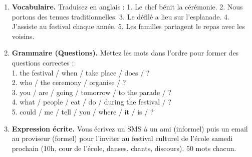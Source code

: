 \documentclass[11pt]{article}
\begin{document}
\begin{exercice}
\begin{enumerate}
\item \textbf{Vocabulaire.} Traduisez en anglais : 1. Le chef bénit la cérémonie. 2. Nous portons des tenues traditionnelles. 3. Le défilé a lieu sur l'esplanade. 4. J'assiste au festival chaque année. 5. Les familles partagent le repas avec les voisins.
\item \textbf{Grammaire (Questions).} Mettez les mots dans l'ordre pour former des questions correctes :\\
1. the festival / when / take place / does / ? \\
2. who / the ceremony / organise / ? \\
3. you / are / going / tomorrow / to the parade / ? \\
4. what / people / eat / do / during the festival / ? \\
5. could / me / tell / you / where / it / is / ?
\item \textbf{Expression écrite.} Vous écrivez un SMS à un ami (informel) puis un email au proviseur (formel) pour l'inviter au festival culturel de l'école samedi prochain (10h, cour de l'école, danses, chants, discours). 50 mots chacun.
\end{enumerate}
\end{exercice}
\end{document}
